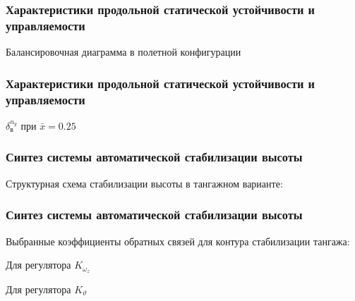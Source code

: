 \documentclass{beamer}
\begin{document}
\begin{frame}[t]
    \frametitle{Характеристики продольной статической устойчивости и управляемости}
    \begin{center}
        Балансировочная диаграмма в полетной конфигурации 
        \resizebox{.70\linewidth}{!}{}
    \end{center}
\end{frame}

\begin{frame}[t]
    \frametitle{Характеристики продольной статической устойчивости и управляемости}
    \begin{center}
        $\delta_{в}^{n_y}$ при $\bar{x} = 0.25$

        \resizebox{0.70\textwidth}{!}{}
    \end{center}
\end{frame}

\begin{frame}
    \frametitle{Синтез системы автоматической стабилизации высоты}
    \begin{center}
        Структурная схема стабилизации высоты в тангажном варианте:
        \vspace{14pt}

        \resizebox{1.35\textwidth}{!}{}
    \end{center}
\end{frame}
\begin{frame}[t]
    \frametitle{Синтез системы автоматической стабилизации высоты}
    \begin{center}
        Выбранные коэффициенты обратных связей для контура стабилизации тангажа:
        \vspace{14pt}

        \begin{minipage}{0.45\textwidth}
            \begin{center}
                Для регулятора $K_{\omega_z}$\\
                \resizebox{\textwidth}{!}{}
            \end{center}
        \end{minipage}
        \hfill
        \begin{minipage}{0.45\textwidth}
            \begin{center}
                Для регулятора $K_{\vartheta}$\\
                \resizebox{\textwidth}{!}{}
            \end{center}
        \end{minipage}
    \end{center}
\end{frame}
\end{document}
